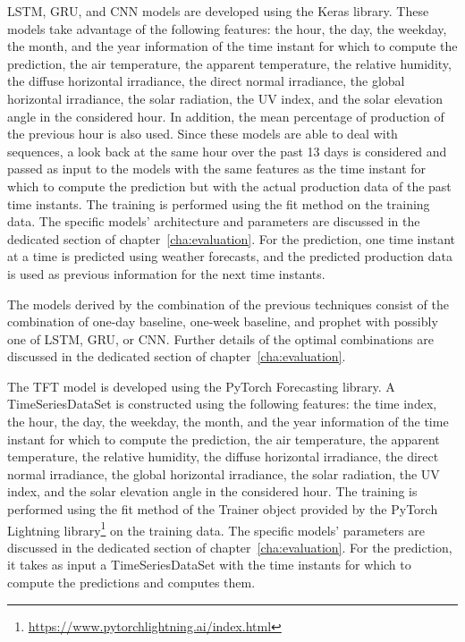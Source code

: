 LSTM, GRU, and CNN models are developed using the Keras library.
These models take advantage of the following features: the hour, the day, the weekday, the month, and the year information of the time instant for which to compute the prediction, the air temperature, the apparent temperature, the relative humidity, the diffuse horizontal irradiance, the direct normal irradiance, the global horizontal irradiance, the solar radiation, the UV index, and the solar elevation angle in the considered hour.
In addition, the mean percentage of production of the previous hour is also used.
Since these models are able to deal with sequences, a look back at the same hour over the past 13 days is considered and passed as input to the models with the same features as the time instant for which to compute the prediction but with the actual production data of the past time instants.
The training is performed using the fit method on the training data.
The specific models’ architecture and parameters are discussed in the dedicated section of chapter~\ref{cha:evaluation}.
For the prediction, one time instant at a time is predicted using weather forecasts, and the predicted production data is used as previous information for the next time instants.

The models derived by the combination of the previous techniques consist of the combination of one-day baseline, one-week baseline, and prophet with possibly one of LSTM, GRU, or CNN.
Further details of the optimal combinations are discussed in the dedicated section of chapter~\ref{cha:evaluation}.

The TFT model is developed using the PyTorch Forecasting library.
A TimeSeriesDataSet is constructed using the following features: the time index, the hour, the day, the weekday, the month, and the year information of the time instant for which to compute the prediction, the air temperature, the apparent temperature, the relative humidity, the diffuse horizontal irradiance, the direct normal irradiance, the global horizontal irradiance, the solar radiation, the UV index, and the solar elevation angle in the considered hour.
The training is performed using the fit method of the Trainer object provided by the PyTorch Lightning library\footnote{ \url{https://www.pytorchlightning.ai/index.html} } on the training data.
The specific models’ parameters are discussed in the dedicated section of chapter~\ref{cha:evaluation}.
For the prediction, it takes as input a TimeSeriesDataSet with the time instants for which to compute the predictions and computes them.

